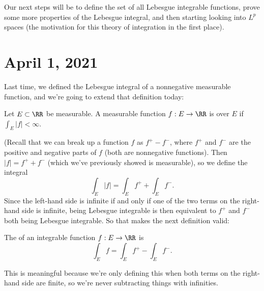 Our next steps will be to define the set of all Lebesgue integrable functions, prove some more properties of the Lebesgue integral, and then starting looking into $L^p$ spaces (the motivation for this theory of integration in the first place). 


\pagebreak\section*{April 1, 2021}

Last time, we defined the Lebesgue integral of a nonnegative measurable function, and we're going to extend that definition today:

\begin{definition}
Let $E \subset \RR$ be measurable. A measurable function $f: E \to \RR$ is  over $E$ if $\int_E |f| < \infty$.
\end{definition}

(Recall that we can break up a function $f$ as $f^+ - f^-$, where $f^+$ and $f^-$ are the positive and negative parts of $f$ (both are nonnegative functions). Then $|f| = f^+ + f^-$ (which we've previously showed is measurable), so we define the integral
\[
    \int_E |f| = \int_E f^+ + \int_E f^-. 
\]
Since the left-hand side is infinite if and only if one of the two terms on the right-hand side is infinite, being Lebesgue integrable is then equivalent to $f^+$ and $f^-$ both being Lebesgue integrable. So that makes the next definition valid:

\begin{definition}
The  of an integrable function $f: E \to \RR$ is 
\[
    \int_E f = \int_E f^+ - \int_E f^-.
\]
\end{definition}

This is meaningful because we're only defining this when both terms on the right-hand side are finite, so we're never subtracting things with infinities. 

